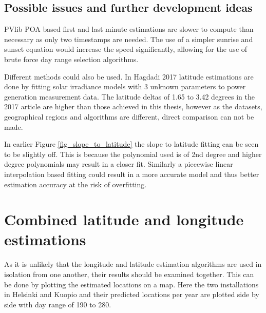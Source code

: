 \subsection{Possible issues and further development ideas}
PVlib POA based first and last minute estimations are slower to compute than necessary as only two timestamps are needed. The use of a simpler sunrise and sunset equation would increase the speed significantly, allowing for the use of brute force day range selection algorithms.

Different methods could also be used. In Hagdadi 2017 \cite{navid_australian_article} latitude estimations are done by fitting solar irradiance models with 3 unknown parameters to power generation measurement data. The latitude deltas of 1.65 to 3.42 degrees in the 2017 article are higher than those achieved in this thesis, however as the datasets, geographical regions and algorithms are different, direct comparison can not be made.


In earlier Figure \ref{fig_slope_to_latitude} the slope to latitude fitting can be seen to be slightly off. This is because the polynomial used is of 2nd degree and higher degree polynomials may result in a closer fit. Similarly a piecewise linear interpolation based fitting could result in a more accurate model and thus better estimation accuracy at the risk of overfitting. 


\newpage
\section{Combined latitude and longitude estimations}
As it is unlikely that the longitude and latitude estimation algorithms are used in isolation from one another, their results should be examined together. This can be done by plotting the estimated locations on a map. Here the two installations in Helsinki and Kuopio and their predicted locations per year are plotted side by side with day range of 190 to 280.

